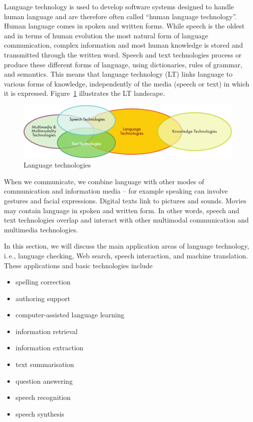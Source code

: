 \begin{multicols}{2}

Language technology is used to develop software systems designed to handle human language and are therefore often called “human language technology”. Human language comes in spoken and written forms. While speech is the oldest and in terms of human evolution the most natural form of language communication, complex information and most human knowledge is stored and transmitted through the written word. Speech and text technologies process or produce these different forms of language, using dictionaries, rules of grammar, and semantics. This means that language technology (LT) links language to various forms of knowledge, independently of the media (speech or text) in which it is expressed. Figure~\ref{fig:ltincontext_en} illustrates the LT landscape.

\begin{figure}[htb]
  \center
  \includegraphics[width=\textwidth]{../_media/english/language_technologies}
  \caption{Language technologies}
\label{fig:ltincontext_en}
\end{figure}

When we communicate, we combine language with other modes of communication and information media – for example speaking can involve gestures and facial expressions. Digital texts link to pictures and sounds. Movies may contain language in spoken and written form. In other words, speech and text technologies overlap and interact with other multimodal communication and multimedia technologies. 

In this section, we will discuss the main application areas of language technology, i.\,e., language checking, Web search, speech interaction, and machine translation. These applications and basic technologies include 

\begin{itemize}
\item spelling correction
\item authoring support
\item computer-assisted language learning
\item information retrieval 
\item information extraction
\item text summarisation
\item question answering
\item speech recognition 
\item speech synthesis 
\end{itemize}


\end{multicols}
